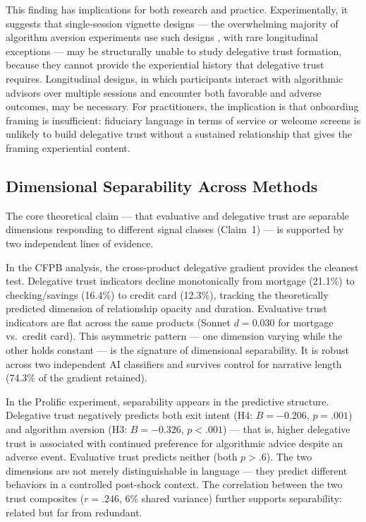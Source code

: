 This finding has implications for both research and practice. Experimentally, it suggests that single-session vignette designs --- the overwhelming majority of algorithm aversion experiments use such designs \citep{ChaconKauselReyes2022}, with rare longitudinal exceptions \citep[e.g.,][]{LeeChoWoodeJong2026} --- may be structurally unable to study delegative trust formation, because they cannot provide the experiential history that delegative trust requires. Longitudinal designs, in which participants interact with algorithmic advisors over multiple sessions and encounter both favorable and adverse outcomes, may be necessary. For practitioners, the implication is that onboarding framing is insufficient: fiduciary language in terms of service or welcome screens is unlikely to build delegative trust without a sustained relationship that gives the framing experiential content.

\subsection{Dimensional Separability Across Methods}
\label{sec:disc_separability}

The core theoretical claim --- that evaluative and delegative trust are separable dimensions responding to different signal classes (Claim~1) --- is supported by two independent lines of evidence.

In the CFPB analysis, the cross-product delegative gradient provides the cleanest test. Delegative trust indicators decline monotonically from mortgage (21.1\%) to checking/savings (16.4\%) to credit card (12.3\%), tracking the theoretically predicted dimension of relationship opacity and duration. Evaluative trust indicators are flat across the same products (Sonnet $d = 0.030$ for mortgage vs.\ credit card). This asymmetric pattern --- one dimension varying while the other holds constant --- is the signature of dimensional separability. It is robust across two independent AI classifiers and survives control for narrative length (74.3\% of the gradient retained).

In the Prolific experiment, separability appears in the predictive structure. Delegative trust negatively predicts both exit intent (H4: $B = -0.206$, $p = .001$) and algorithm aversion (H3: $B = -0.326$, $p < .001$) --- that is, higher delegative trust is associated with continued preference for algorithmic advice despite an adverse event. Evaluative trust predicts neither (both $p > .6$). The two dimensions are not merely distinguishable in language --- they predict different behaviors in a controlled post-shock context. The correlation between the two trust composites ($r = .246$, 6\% shared variance) further supports separability: related but far from redundant.

